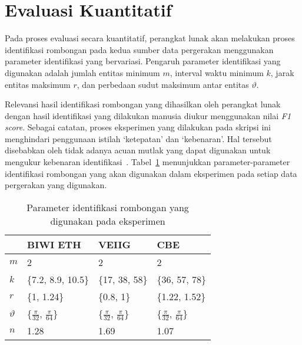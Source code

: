 \section{Evaluasi Kuantitatif}
\label{sec:quantitative}

Pada proses evaluasi secara kuantitatif, perangkat lunak akan melakukan proses identifikasi rombongan pada kedua sumber data pergerakan menggunakan parameter identifikasi yang bervariasi. Pengaruh parameter identifikasi yang digunakan adalah jumlah entitas minimum $m$, interval waktu minimum $k$, jarak entitas maksimum $r$, dan perbedaan sudut maksimum antar entitas $\vartheta$. 

Relevansi hasil identifikasi rombongan yang dihasilkan oleh perangkat lunak dengan hasil identifikasi yang dilakukan manusia diukur menggunakan nilai \textit{F1 score}. Sebagai catatan, proses eksperimen yang dilakukan pada skripsi ini menghindari penggunaan istilah `ketepatan' dan `kebenaran'. Hal tersebut disebabkan oleh tidak adanya acuan mutlak yang dapat digunakan untuk mengukur kebenaran identifikasi~\cite{wiratma:software}. Tabel~\ref{bab6:parameter} menunjukkan parameter-parameter identifikasi rombongan yang akan digunakan dalam eksperimen pada setiap data pergerakan yang digunakan.

\begin{table}[h]
    \centering
    \caption[Parameter identifikasi rombongan]{Parameter identifikasi rombongan yang digunakan pada eksperimen}
    \begin{tabular}{p{1cm} p{2.5cm} p{2.5cm} p{2.5cm}}
        \hline
        & \textbf{BIWI ETH} & \textbf{VEIIG} & \textbf{CBE} \\
        \hline
        $m$ & 2 & 2 & 2 \\
        $k$ & \{7.2, 8.9, 10.5\} & \{17, 38, 58\} & \{36, 57, 78\} \\
        $r$ & \{1, 1.24\} & \{0.8, 1\} & \{1.22, 1.52\} \\
        $\vartheta$ & \{$\frac{\pi}{32}$, $\frac{\pi}{64}$\} & \{$\frac{\pi}{32}$, $\frac{\pi}{64}$\} & \{$\frac{\pi}{32}$, $\frac{\pi}{64}$\} \\
        $n$ & 1.28 & 1.69 & 1.07 \\
        \hline
    \end{tabular}
    
    \label{bab6:parameter}
\end{table}

